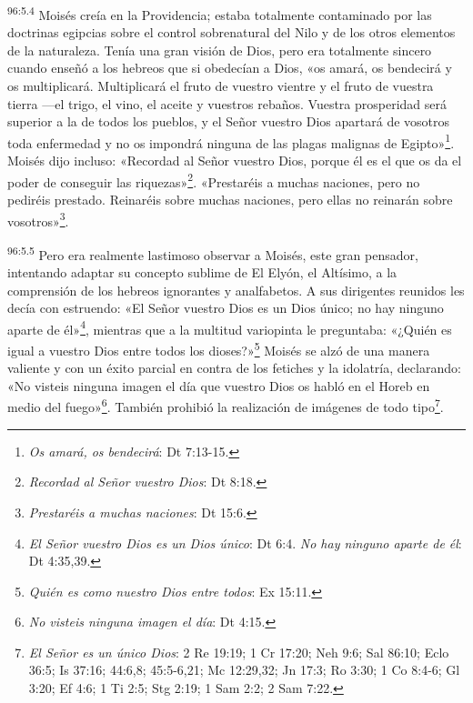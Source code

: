 \par
\textsuperscript{96:5.4} Moisés creía en la Providencia; estaba totalmente contaminado por las doctrinas egipcias sobre el control sobrenatural del Nilo y de los otros elementos de la naturaleza. Tenía una gran visión de Dios, pero era totalmente sincero cuando enseñó a los hebreos que si obedecían a Dios, «os amará, os bendecirá y os multiplicará. Multiplicará el fruto de vuestro vientre y el fruto de vuestra tierra ---el trigo, el vino, el aceite y vuestros rebaños. Vuestra prosperidad será superior a la de todos los pueblos, y el Señor vuestro Dios apartará de vosotros toda enfermedad y no os impondrá ninguna de las plagas malignas de Egipto»\footnote{\textit{Os amará, os bendecirá}: Dt 7:13-15.}. Moisés dijo incluso: «Recordad al Señor vuestro Dios, porque él es el que os da el poder de conseguir las riquezas»\footnote{\textit{Recordad al Señor vuestro Dios}: Dt 8:18.}. «Prestaréis a muchas naciones, pero no pediréis prestado. Reinaréis sobre muchas naciones, pero ellas no reinarán sobre vosotros»\footnote{\textit{Prestaréis a muchas naciones}: Dt 15:6.}.

\par
\textsuperscript{96:5.5} Pero era realmente lastimoso observar a Moisés, este gran pensador, intentando adaptar su concepto sublime de El Elyón, el Altísimo, a la comprensión de los hebreos ignorantes y analfabetos. A sus dirigentes reunidos les decía con estruendo: «El Señor vuestro Dios es un Dios único; no hay ninguno aparte de él»\footnote{\textit{El Señor vuestro Dios es un Dios único}: Dt 6:4. \textit{No hay ninguno aparte de él}: Dt 4:35,39.}, mientras que a la multitud variopinta le preguntaba: «¿Quién es igual a vuestro Dios entre todos los dioses?»\footnote{\textit{Quién es como nuestro Dios entre todos}: Ex 15:11.} Moisés se alzó de una manera valiente y con un éxito parcial en contra de los fetiches y la idolatría, declarando: «No visteis ninguna imagen el día que vuestro Dios os habló en el Horeb en medio del fuego»\footnote{\textit{No visteis ninguna imagen el día}: Dt 4:15.}. También prohibió la realización de imágenes de todo tipo\footnote{\textit{El Señor es un único Dios}: 2 Re 19:19; 1 Cr 17:20; Neh 9:6; Sal 86:10; Eclo 36:5; Is 37:16; 44:6,8; 45:5-6,21; Mc 12:29,32; Jn 17:3; Ro 3:30; 1 Co 8:4-6; Gl 3:20; Ef 4:6; 1 Ti 2:5; Stg 2:19; 1 Sam 2:2; 2 Sam 7:22.}.

